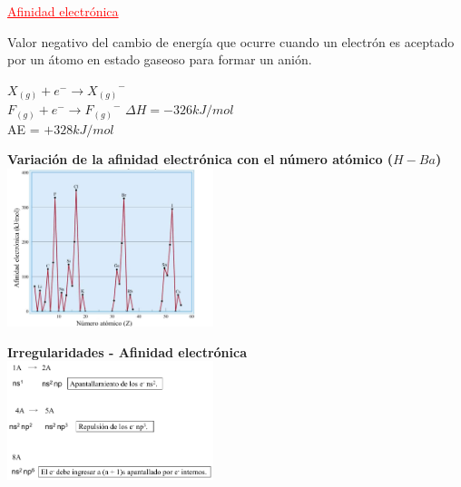         \begin{center} \textcolor{red}{\underline{Afinidad electrónica}} \end{center}
            \indent Valor negativo del cambio de energía que ocurre cuando un electrón es aceptado por un átomo en estado gaseoso para formar un anión.
            \begin{center}
                $X_{(g)} + e^- \rightarrow {X_{(g)}}^-$ \\[10pt]
                $F_{(g)} + e^- \rightarrow {F_{(g)}}^-$ $\Delta H = -326 kJ/mol$ \\
                AE = $+ 328 kJ/mol$ \\ 
            \end{center}
            \saltoPag%
            \begin{center}
                \textbf{Variación de la afinidad electrónica con el número atómico ($H - Ba$)} \\
                \includegraphics[width=6cm]{./imagenes/variacionAfinidadElectronicaNumeroAtomico.png}
            \end{center}

            \begin{center}
                \textbf{Irregularidades - Afinidad electrónica} \\
                \includegraphics[width=6cm]{./imagenes/irregularidadesAfinidadElectronica.png}
            \end{center}
            

